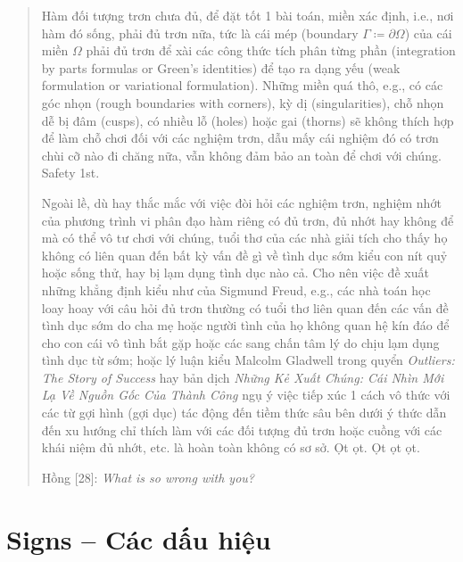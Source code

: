 \documentclass[12pt,twoside]{book}
\begin{document}
\begin{quote}
	Hàm đối tượng trơn chưa đủ, để đặt tốt 1 bài toán, miền xác định, i.e., nơi hàm đó sống, phải đủ trơn nữa, tức là cái mép (boundary $\Gamma\coloneqq\partial\Omega$) của cái miền $\Omega$ phải đủ trơn để xài các công thức tích phân từng phần (integration by parts formulas or Green's identities) để tạo ra dạng yếu (weak formulation or variational formulation). Những miền quá thô, e.g., có các góc nhọn (rough boundaries with corners), kỳ dị (singularities), chỗ nhọn dễ bị đâm (cusps), có nhiều lỗ (holes) hoặc gai (thorns) sẽ không thích hợp để làm chỗ chơi đối với các nghiệm trơn, dẫu mấy cái nghiệm đó có trơn chùi cỡ nào đi chăng nữa, vẫn không đảm bảo an toàn để chơi với chúng. Safety 1st.
	
	Ngoài lề, dù hay thắc mắc với việc đòi hỏi các nghiệm trơn, nghiệm nhớt của phương trình vi phân đạo hàm riêng có đủ trơn, đủ nhớt hay không để mà có thể vô tư chơi với chúng, tuổi thơ của các nhà giải tích cho thấy họ không có liên quan đến bất kỳ vấn đề gì về tình dục sớm kiểu con nít quỷ hoặc sống thử, hay bị lạm dụng tình dục nào cả. Cho nên việc đề xuất những khẳng định kiểu như của {\sc Sigmund Freud}, e.g., các nhà toán học loay hoay với câu hỏi đủ trơn thường có tuổi thơ liên quan đến các vấn đề tình dục sớm do cha mẹ hoặc người tình của họ không quan hệ kín đáo để cho con cái vô tình bắt gặp hoặc các sang chấn tâm lý do chịu lạm dụng tình dục từ sớm; hoặc lý luận kiểu {\sc Malcolm Gladwell} trong quyển {\it Outliers: The Story of Success} \cite{Gladwell2008} hay bản dịch {\it Những Kẻ Xuất Chúng: Cái Nhìn Mới Lạ Về Nguồn Gốc Của Thành Công} \cite{Gladwell_outlier} ngụ ý việc tiếp xúc 1 cách vô thức với các từ gợi hình (gợi dục) tác động đến tiềm thức sâu bên dưới ý thức dẫn đến xu hướng chỉ thích làm với các đối tượng đủ trơn hoặc cuồng với các khái niệm đủ nhớt, etc. là hoàn toàn không có sơ sở. Ọt ọt. Ọt ọt ọt.
	
	{\sf Hồng [28]}: {\it What is so wrong with you?}
\end{quote}

\section{Signs -- Các dấu hiệu}
\end{document}
